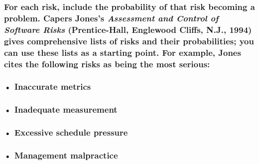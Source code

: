 \documentclass[
]{article}
\begin{document}
\hypertarget{for-each-risk-include-the-probability-of-that-risk-becoming-a-problem.-capers-joness-assessment-and-control-of-software-risks-prentice-hall-englewood-cliffs-n.j.-1994-gives-comprehensive-lists-of-risks-and-their-probabilities-you-can-use-these-lists-as-a-starting-point.-for-example-jones-cites-the-following-risks-as-being-the-most-serious}{%
\subsubsection{\texorpdfstring{For each risk, include the probability of
that risk becoming a problem. Capers Jones's \emph{Assessment and
Control of Software Risks} (Prentice-Hall, Englewood Cliffs, N.J., 1994)
gives comprehensive lists of risks and their probabilities; you can use
these lists as a starting point. For example, Jones cites the following
risks as being the most
serious:}{For each risk, include the probability of that risk becoming a problem. Capers Jones's Assessment and Control of Software Risks (Prentice-Hall, Englewood Cliffs, N.J., 1994) gives comprehensive lists of risks and their probabilities; you can use these lists as a starting point. For example, Jones cites the following risks as being the most serious:}}\label{for-each-risk-include-the-probability-of-that-risk-becoming-a-problem.-capers-joness-assessment-and-control-of-software-risks-prentice-hall-englewood-cliffs-n.j.-1994-gives-comprehensive-lists-of-risks-and-their-probabilities-you-can-use-these-lists-as-a-starting-point.-for-example-jones-cites-the-following-risks-as-being-the-most-serious}}

\hypertarget{inaccurate-metrics}{%
\subsubsection{• Inaccurate metrics}\label{inaccurate-metrics}}

\hypertarget{inadequate-measurement}{%
\subsubsection{• Inadequate measurement}\label{inadequate-measurement}}

\hypertarget{excessive-schedule-pressure}{%
\subsubsection{• Excessive schedule
pressure}\label{excessive-schedule-pressure}}

\hypertarget{management-malpractice}{%
\subsubsection{\texorpdfstring{• Management malpractice
}{• Management malpractice }}\label{management-malpractice}}
\end{document}
